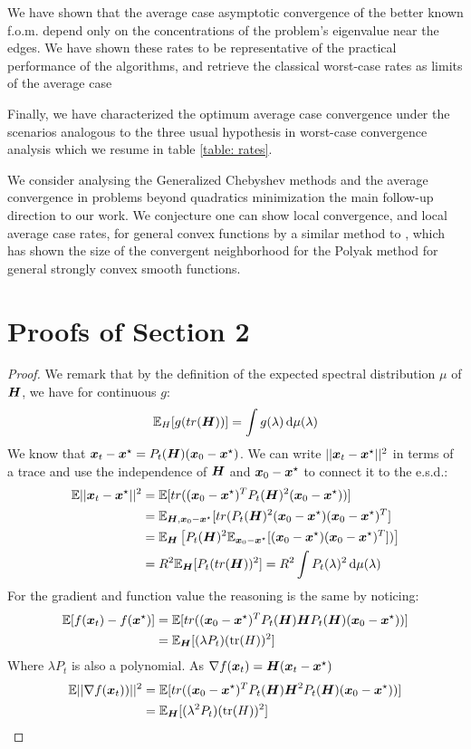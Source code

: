 \documentclass{article}
\begin{document}
We have  shown that the average case asymptotic convergence of  the better known f.o.m. depend only on the concentrations of the problem's eigenvalue near the edges. We have shown these rates to be representative of the practical performance of the algorithms, and retrieve the classical worst-case rates as limits of the average case

Finally, we have characterized the optimum average case convergence under the scenarios analogous to the three usual hypothesis in worst-case convergence analysis which we resume in table \ref{table: rates}.

We consider analysing the Generalized Chebyshev methods and the average convergence in problems beyond quadratics minimization the main follow-up direction to our work. We conjecture one can show local convergence, and local average case rates, for general convex functions by a similar method to \cite{wang2021modular}, which has shown the size of the convergent neighborhood for the Polyak method for general strongly convex smooth functions.
\newpage



\appendix
\newpage
\section{Proofs of Section 2}
\metrics*
\begin{proof}
\newcommand\xinit{\xx_0-\xx^\star}
We remark that by the definition of the expected spectral distribution $\mu$ of ${\boldsymbol H}$, we have for continuous $g$:
\begin{equation}
    {\mathbb{E}}_H[g(tr({\boldsymbol H}))]=\int g(\lambda)\mathop{}\!\mathrm{d} \mu(\lambda)
\end{equation}
We know that $\xx_t-\xx^\star=P_t(\HH)(\xinit)$. We can write $||{\boldsymbol x}_t-{\boldsymbol x}^\star||^2$ in terms of a trace and use the independence of ${\boldsymbol H}$ and $\xinit$ to connect it to the e.s.d.:
\begin{align}
    \mathbb{E}||\xx_t-\xx^\star||^2&=\EE[ tr((\xinit)^TP_t(\HH)^2(\xinit))] \\
    &=\EE_{\HH,\xinit} [tr(P_t(\HH)^2(\xinit)(\xinit)^T]\\
    &=\EE_\HH\left[P_t(\HH)^2\EE_{\xinit}[(\xinit)(\xinit)^T])\right]  \\
    &=R^2\EE_\HH[P_t(tr(\HH))^2]=R^2 \int P_t(\lambda)^2\dif\mu(\lambda)
\end{align}
For the gradient and function value the reasoning is the same by noticing:
\begin{align}
    \EE[f(\xx_t)-f(\xx^\star)]&=\EE[ tr((\xinit)^TP_t(\HH)\HH P_t(\HH)(\xinit))]\\
    &=\EE_\HH[(\lambda P_t)(\tr(H))^2] 
\end{align}
Where $\lambda P_t$ is also a  polynomial. As $\nabla f({\boldsymbol x}_t)={\boldsymbol H}({\boldsymbol x}_t-{\boldsymbol x}^\star)$
\begin{align}
    \EE||\nabla f(\xx_t))||^2&=\EE[ tr((\xinit)^TP_t(\HH)\HH^2 P_t(\HH)(\xinit))]\\
    &=\EE_\HH[(\lambda^2 P_t)(\tr(H))^2]
\end{align}


\end{proof}
\end{document}
